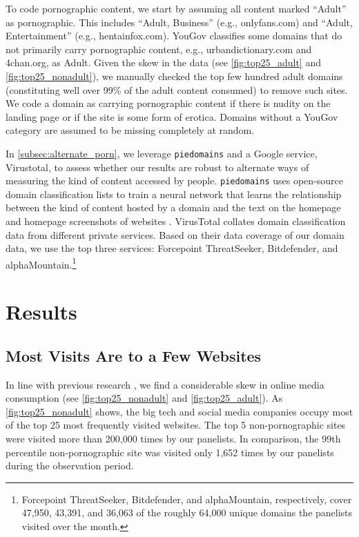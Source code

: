 \documentclass[12pt, letterpaper]{article}
\begin{document}
To code pornographic content, we start by assuming all content marked ``Adult'' as pornographic. This includes ``Adult, Business'' (e.g., onlyfans.com) and ``Adult, Entertainment'' (e.g., hentainfox.com). YouGov classifies some domains that do not primarily carry pornographic content, e.g., urbandictionary.com and 4chan.org, as Adult. Given the skew in the data (see \cref{fig:top25_adult} and \cref{fig:top25_nonadult}), we manually checked the top few hundred adult domains (constituting well over 99\% of the adult content consumed) to remove such sites. We code a domain as carrying pornographic content if there is nudity on the landing page or if the site is some form of erotica. Domains without a YouGov category are assumed to be missing completely at random. 

In \ref{subsec:alternate_porn}, we leverage \texttt{piedomains} and a Google service, Virustotal, to assess whether our results are robust to alternate ways of measuring the kind of content accessed by people. \texttt{piedomains} uses open-source domain classification lists to train a neural network that learns the relationship between the kind of content hosted by a domain and the text on the homepage and homepage screenshots of websites \citep{Chintalapati_piedomains_Predict_the_2022}. 
VirusTotal collates domain classification data from different private services. Based on their data coverage of our domain data, we use the top three services: Forcepoint ThreatSeeker, Bitdefender, and alphaMountain.\footnote{Forcepoint ThreatSeeker, Bitdefender, and alphaMountain, respectively, cover 47,950, 43,391, and 36,063 of the roughly 64,000 unique domains the panelists visited over the month.}

\section{Results}\label{sec:results}
\subsection{Most Visits Are to a Few Websites}
\label{subsec:concentration_media_consumption}

In line with previous research \citep{hindman2009myth, Dewan2004-tt}, we find a considerable skew in online media consumption (see \cref{fig:top25_nonadult} and \cref{fig:top25_adult}). As \cref{fig:top25_nonadult} shows, the big tech and social media companies occupy most of the top 25 most frequently visited websites. The top 5 non-pornographic sites were visited more than 200,000 times by our panelists. In comparison, the 99th percentile non-pornographic site was visited only 1,652 times by our panelists during the observation period. 
\end{document}
